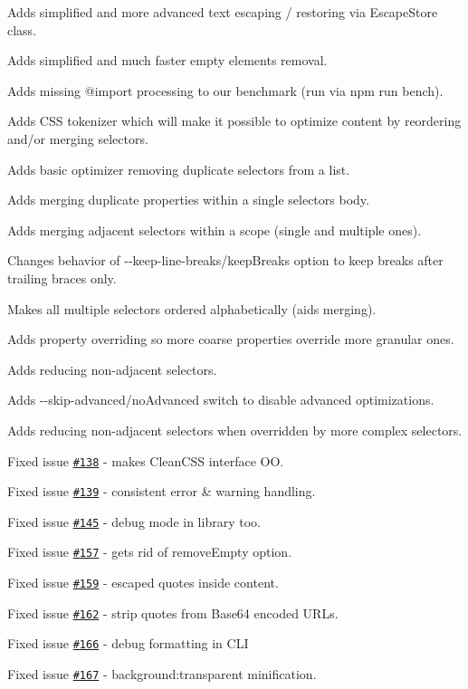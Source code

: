 \begin{DoxyItemize}
\item Adds simplified and more advanced text escaping / restoring via {\ttfamily Escape\+Store} class.
\item Adds simplified and much faster empty elements removal.
\item Adds missing {\ttfamily @import} processing to our benchmark (run via {\ttfamily npm run bench}).
\item Adds C\+SS tokenizer which will make it possible to optimize content by reordering and/or merging selectors.
\item Adds basic optimizer removing duplicate selectors from a list.
\item Adds merging duplicate properties within a single selector\textquotesingle{}s body.
\item Adds merging adjacent selectors within a scope (single and multiple ones).
\item Changes behavior of {\ttfamily -\/-\/keep-\/line-\/breaks}/{\ttfamily keep\+Breaks} option to keep breaks after trailing braces only.
\item Makes all multiple selectors ordered alphabetically (aids merging).
\item Adds property overriding so more coarse properties override more granular ones.
\item Adds reducing non-\/adjacent selectors.
\item Adds {\ttfamily -\/-\/skip-\/advanced}/{\ttfamily no\+Advanced} switch to disable advanced optimizations.
\item Adds reducing non-\/adjacent selectors when overridden by more complex selectors.
\item Fixed issue \href{https://github.com/jakubpawlowicz/clean-css/issues/138}{\tt \#138} -\/ makes Clean\+C\+SS interface OO.
\item Fixed issue \href{https://github.com/jakubpawlowicz/clean-css/issues/138}{\tt \#139} -\/ consistent error \& warning handling.
\item Fixed issue \href{https://github.com/jakubpawlowicz/clean-css/issues/145}{\tt \#145} -\/ debug mode in library too.
\item Fixed issue \href{https://github.com/jakubpawlowicz/clean-css/issues/157}{\tt \#157} -\/ gets rid of {\ttfamily remove\+Empty} option.
\item Fixed issue \href{https://github.com/jakubpawlowicz/clean-css/issues/159}{\tt \#159} -\/ escaped quotes inside content.
\item Fixed issue \href{https://github.com/jakubpawlowicz/clean-css/issues/162}{\tt \#162} -\/ strip quotes from Base64 encoded U\+R\+Ls.
\item Fixed issue \href{https://github.com/jakubpawlowicz/clean-css/issues/166}{\tt \#166} -\/ {\ttfamily debug} formatting in C\+LI
\item Fixed issue \href{https://github.com/jakubpawlowicz/clean-css/issues/167}{\tt \#167} -\/ {\ttfamily background\+:transparent} minification.
\end{DoxyItemize}

